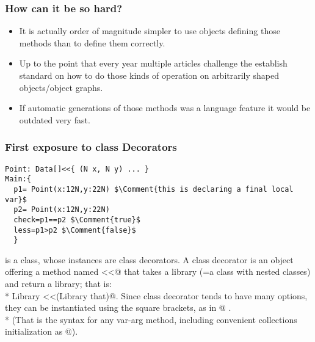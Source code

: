 \begin{frame}[fragile]
\frametitle{How can it be so hard?}
\begin{itemize}
\item It is actually order of magnitude  simpler to use objects defining those methods than to define them correctly.
\pause\item Up to the point that every year multiple articles challenge  the establish standard on how to
do those kinds of operation on arbitrarily shaped objects/object graphs.
\pause\item If automatic generations of those methods was a language feature
it would be outdated very fast.
\end{itemize}
\end{frame}


\begin{frame}[fragile]
\frametitle{First exposure to class Decorators}
\begin{NiceCode}{59ex}{0.8}
\begin{lstlisting}
Point: Data[]<<{ (N x, N y) ... }
Main:{
  p1= Point(x:12N,y:22N) $\Comment{this is declaring a final local var}$
  p2= Point(x:12N,y:22N)
  check=p1==p2 $\Comment{true}$
  less=p1>p2 $\Comment{false}$
  }
\end{lstlisting}
\end{NiceCode}
\Q@Data@  is a class, whose instances are class decorators.
A class decorator is an object offering  a method named \Q@<<@ that takes a library (=a class with nested classes) and return a library; that is:\\*
\Q@method Library <<(Library that)@.
Since class decorator tends to have many options, they can be instantiated using the square brackets, as in @  .\\*
(That is the syntax for any var-arg method, including convenient collections initialization as \Q@NVec[a;b;c;]@).

\end{frame}


